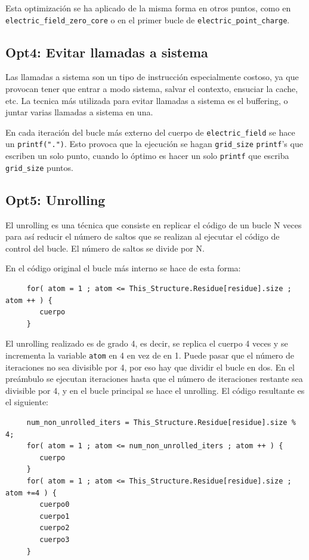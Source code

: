 Esta optimizaci\'{o}n se ha aplicado de la misma forma en otros puntos, como en
\texttt{electric\_field\_zero\_core} o en el primer bucle de
\texttt{electric\_point\_charge}.

\subsection{Opt4: Evitar llamadas a sistema}

Las llamadas a sistema son un tipo de instrucci\'{o}n especialmente costoso, ya
que provocan tener que entrar a modo sistema, salvar el contexto, ensuciar la
cache, etc. La tecnica m\'{a}s utilizada para evitar llamadas a sistema es el
buffering, o juntar varias llamadas a sistema en una.

En cada iteraci\'{o}n del bucle m\'{a}s externo del cuerpo de
\texttt{electric\_field} se hace un \texttt{printf(".")}. Esto provoca que
la ejecuci\'{o}n se hagan \texttt{grid\_size} \texttt{printf}'s que escriben un
solo punto, cuando lo \'{o}ptimo es hacer un solo \texttt{printf} que escriba
\texttt{grid\_size} puntos.

\subsection{Opt5: Unrolling}

El unrolling es una t\'{e}cnica que consiste en replicar el c\'{o}digo de un
bucle N veces para as\'{i} reducir el n\'{u}mero de saltos que se realizan al
ejecutar el c\'{o}digo de control del bucle. El n\'{u}mero de saltos se divide
por N.

En el c\'{o}digo original el bucle m\'{a}s interno se hace de esta forma:

\begin{lstlisting}
     for( atom = 1 ; atom <= This_Structure.Residue[residue].size ; atom ++ ) {
        cuerpo
     }
\end{lstlisting}

El unrolling realizado es de grado 4, es decir, se replica el cuerpo 4 veces y
se incrementa la variable \texttt{atom} en 4 en vez de en 1. Puede pasar que el
n\'{u}mero de iteraciones no sea divisible por 4, por eso hay que dividir el
bucle en dos. En el pre\'{a}mbulo se ejecutan iteraciones hasta que el
n\'{u}mero de iteraciones restante sea divisible por 4, y en el bucle principal
se hace el unrolling. El c\'{o}digo resultante es el siguiente:

\begin{lstlisting}
     num_non_unrolled_iters = This_Structure.Residue[residue].size % 4;
     for( atom = 1 ; atom <= num_non_unrolled_iters ; atom ++ ) {
        cuerpo
     }
     for( atom = 1 ; atom <= This_Structure.Residue[residue].size ; atom +=4 ) {
        cuerpo0
        cuerpo1
        cuerpo2
        cuerpo3
     }
\end{lstlisting}

